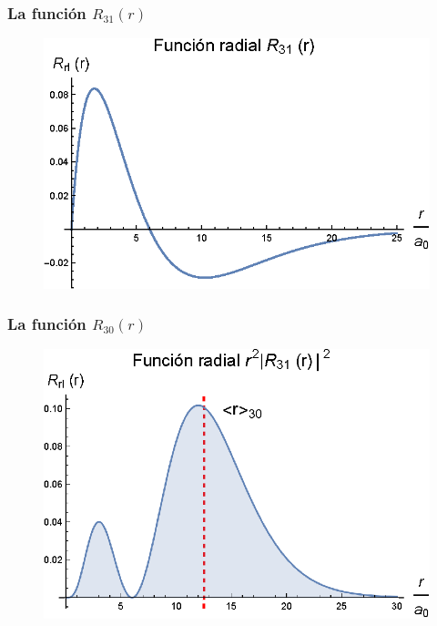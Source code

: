 \documentclass[12pt]{beamer}
\begin{document}
\begin{frame}
\frametitle{La función $R_{31} (r)$}
\begin{figure}
   \centering
   \includegraphics[scale=1]{Imagenes/Plot_Funcion_Radial_Hidrogeno_31_01.eps}
\end{figure}
\end{frame}
\begin{frame}
\frametitle{La función $R_{30} (r)$}
\begin{figure}
   \centering
   \includegraphics[scale=1]{Imagenes/Plot_Funcion_Radial_Hidrogeno_31_02.eps}
\end{figure}
\end{frame}
\end{document}
